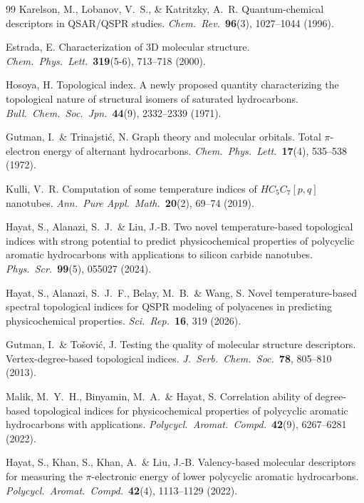 \documentclass[12pt,a4paper]{article}
\begin{document}
\begin{thebibliography}{99}
Karelson, M., Lobanov, V.~S., \& Katritzky, A.~R.
Quantum-chemical descriptors in QSAR/QSPR studies.
\textit{Chem.\ Rev.}\ \textbf{96}(3), 1027--1044 (1996).

Estrada, E.
Characterization of 3D molecular structure.
\textit{Chem.\ Phys.\ Lett.}\ \textbf{319}(5-6), 713--718 (2000).

Hosoya, H.
Topological index. A newly proposed quantity characterizing the topological nature of structural isomers of saturated hydrocarbons.
\textit{Bull.\ Chem.\ Soc.\ Jpn.}\ \textbf{44}(9), 2332--2339 (1971).

Gutman, I.\ \& Trinajsti\'{c}, N.
Graph theory and molecular orbitals. Total $\pi$-electron energy of alternant hydrocarbons.
\textit{Chem.\ Phys.\ Lett.}\ \textbf{17}(4), 535--538 (1972).

Kulli, V.~R.
Computation of some temperature indices of $HC_5C_7[p,q]$ nanotubes.
\textit{Ann.\ Pure Appl.\ Math.}\ \textbf{20}(2), 69--74 (2019).

Hayat, S., Alanazi, S.~J.\ \& Liu, J.-B.
Two novel temperature-based topological indices with strong potential to predict physicochemical properties of polycyclic aromatic hydrocarbons with applications to silicon carbide nanotubes.
\textit{Phys.\ Scr.}\ \textbf{99}(5), 055027 (2024).

Hayat, S., Alanazi, S.~J.~F., Belay, M.~B.\ \& Wang, S.
Novel temperature-based spectral topological indices for QSPR modeling of polyacenes in predicting physicochemical properties.
\textit{Sci.\ Rep.}\ \textbf{16}, 319 (2026).

Gutman, I.\ \& To\v{s}ovi\'{c}, J.
Testing the quality of molecular structure descriptors. Vertex-degree-based topological indices.
\textit{J.\ Serb.\ Chem.\ Soc.}\ \textbf{78}, 805--810 (2013).

Malik, M.~Y.~H., Binyamin, M.~A.\ \& Hayat, S.
Correlation ability of degree-based topological indices for physicochemical properties of polycyclic aromatic hydrocarbons with applications.
\textit{Polycycl.\ Aromat.\ Compd.}\ \textbf{42}(9), 6267--6281 (2022).

Hayat, S., Khan, S., Khan, A.\ \& Liu, J.-B.
Valency-based molecular descriptors for measuring the $\pi$-electronic energy of lower polycyclic aromatic hydrocarbons.
\textit{Polycycl.\ Aromat.\ Compd.}\ \textbf{42}(4), 1113--1129 (2022).


\end{thebibliography}
\end{document}
